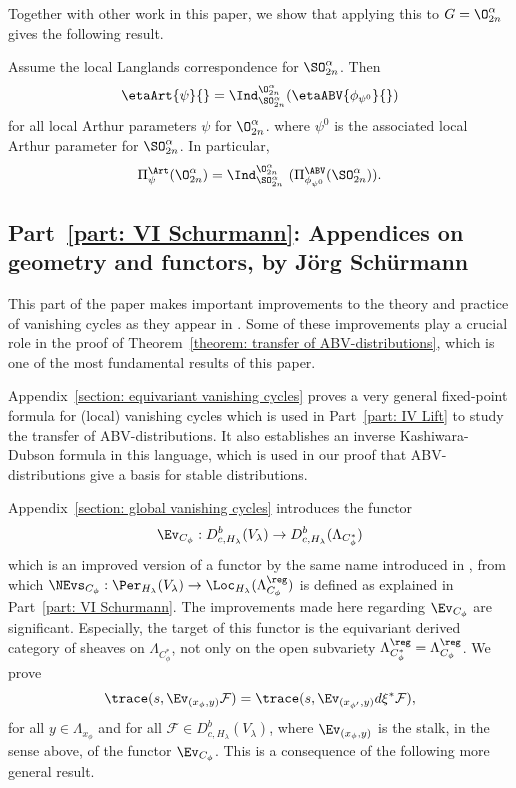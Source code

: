 \documentclass[11pt,letterpaper]{amsart}
\numberwithin{equation}{section}
\begin{document}
Together with other work in this paper, we show that applying this to $G = \O^\alpha_{2n}$ gives the following result.

\begin{theorem}
Assume the local Langlands correspondence for $\SO^\alpha_{2n}$.
Then
\[
\etaArt{\psi}{}
=
\Ind_{\SO^\alpha_{2n}}^{\O^\alpha_{2n}} 
(
\etaABV{\phi_{\psi^0}}{}
)
\]
for all local Arthur parameters $\psi$ for $\O^\alpha_{2n}$.
where $\psi^0$ is the associated local Arthur parameter for $\SO^\alpha_{2n}$.
In particular, 
\[
\Pi^\Art_\psi(\O^\alpha_{2n})
=
\Ind_{\SO^\alpha_{2n}}^{\O^\alpha_{2n}}\ (\Pi^\ABV_{\phi_{\psi^0}}(\SO^\alpha_{2n})).
\]
\end{theorem}




\subsection{Part~\ref{part: VI Schurmann}: Appendices on geometry and functors, by Jörg Schürmann}

This part of the paper makes important improvements to the theory and practice of vanishing cycles as they appear in \cite{CFMMX22}.
Some of these improvements play a crucial role in the proof of Theorem~\ref{theorem: transfer of ABV-distributions}, which is one of the most fundamental results of this paper. 

Appendix~\ref{section: equivariant vanishing cycles} proves a very general fixed-point formula for (local) vanishing cycles which is used in Part~\ref{part: IV Lift} to study the transfer of ABV-distributions. It also establishes an inverse Kashiwara-Dubson formula in this language, which is used in our proof that ABV-distributions give a basis for stable distributions.

Appendix~\ref{section: global vanishing cycles} introduces the functor
\begin{equation}
\Ev_{C_\phi}
:
D^b_{c,H_\lambda}(V_\lambda)
\to
D^b_{c,H_\lambda}(\Lambda_{C^*_\phi})
\end{equation}
which is an improved version of a functor by the same name introduced in \cite{CFMMX22}, from which $\NEvs_{C_\phi}: \Per_{H_\lambda}(V_\lambda) \to \Loc_{H_\lambda}(\Lambda^\reg_{C_\phi})$ is defined as
explained in Part~\ref{part: VI Schurmann}.
The improvements made here regarding $\Ev_{C_\phi}$ are significant. 
Especially, the target of this functor is the equivariant derived category of sheaves on  $\Lambda_{C^*_\phi}$, not only on the open subvariety $\Lambda^\reg_{C^*_\phi} = \Lambda^\reg_{C_\phi}$. 
We prove
\begin{equation}\label{intro: EFPF}
\trace(s,\Ev_{(x_{\phi},y)}\mathcal{F})
=
 \trace(s,\Ev_{(x_{\phi'},y)} d\xi^* \mathcal{F}),
\end{equation}
for all $y\in \Lambda_{x_\phi}$ and  for all $\mathcal{F}\in D^b_{c,H_\lambda}(V_\lambda)$,
where $\Ev_{(x_\phi,y)}$ is the stalk, in the sense above, of the functor $\Ev_{C_\phi}$.
This is a consequence of the following more general result.
\end{document}
